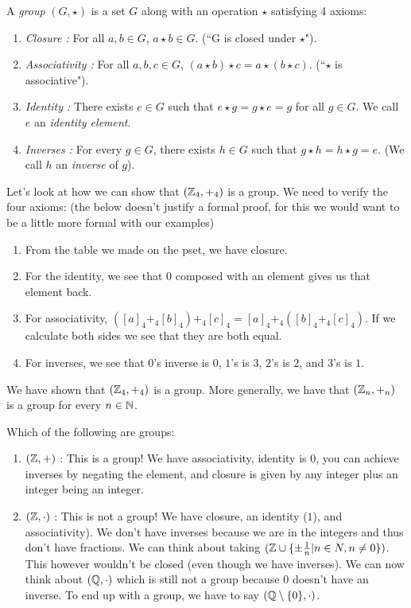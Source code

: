 \begin{definition}[Group]
A \emph{group} $(G, \star)$ is a set $G$ along with an operation $\star$ satisfying 4 axioms:
\begin{enumerate}
    \item \emph{Closure :} For all $a,b \in G$, $a\star b \in G$. (``G is closed under $\star$").
    \item \emph{Associativity :} For all $a, b, c \in G$, $(a\star b) \star c = a \star (b \star c)$. (``$\star$ is associative").
    \item \emph{Identity :} There exists $e \in G$ such that $e \star g = g \star e = g$ for all $g\in G$. We call $e$ an \emph{identity element}. 
    \item \emph{Inverses :} For every $g \in G$, there exists $h \in G$ such that $g \star h = h \star g = e$. (We call $h$ an \emph{inverse} of $g$).
\end{enumerate}
\end{definition}
\begin{example}
Let's look at how we can show that $(\mathbb{Z}_4, +_4)$ is a group. We need to verify the four axioms: (the below doesn't justify a formal proof, for this we would want to be a little more formal with our examples)
\begin{enumerate}
    \item From the table we made on the pset, we have closure. 
    \item For the identity, we see that $0$ composed with an element gives us that element back. 
    \item For associativity, $([a]_4 +_4 [b]_4) +_4 [c]_4 = [a]_4 +_4 ([b]_4 +_4 [c]_4)$. If we calculate both sides we see that they are both equal. 
    \item For inverses, we see that $0$'s inverse is $0$, $1$'s is $3$, $2$'s is $2$, and $3$'s is $1$. 
\end{enumerate}
We have shown that $(\mathbb{Z}_4, +_4)$ is a group. More generally, we have that $(\mathbb{Z}_n, +_n)$ is a group for every $n\in \mathbb{N}$.
\end{example}
\begin{example}
Which of the following are groups:
\begin{enumerate}
    \item $(\mathbb{Z}, +)$ : This is a group! We have associativity, identity is $0$, you can achieve inverses by negating the element, and closure is given by any integer plus an integer being an integer. 
    \item $(\mathbb{Z}, \cdot)$ : This is not a group! We have closure, an identity ($1$), and associativity). We don't have inverses because we are in the integers and thus don't have fractions. We can think about taking $(\mathbb{Z} \cup \{\pm \frac{1}{n} | n \in N, n \ne 0\})$. This however wouldn't be closed (even though we have inverses). We can now think about $(\mathbb{Q}, \cdot)$ which is still not a group because $0$ doesn't have an inverse. To end up with a group, we have to say $(\mathbb{Q} \setminus \{0\}, \cdot)$.
\end{enumerate}
\end{example}
